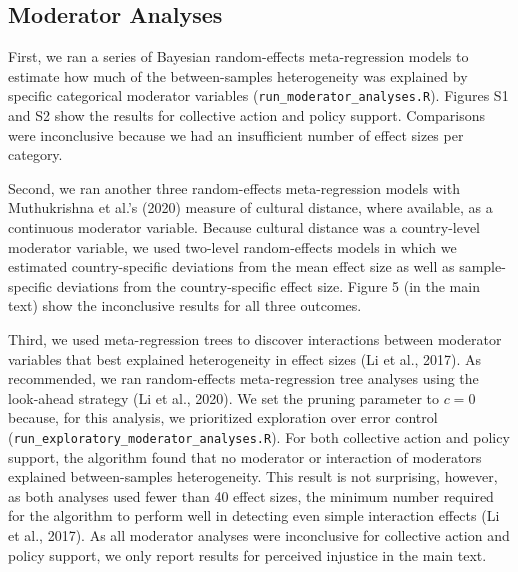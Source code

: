 \documentclass[12pt, letterpaper]{article}
\begin{document}
\hypertarget{moderator-analyses}{%
\subsection{Moderator Analyses}\label{moderator-analyses}}

First, we ran a series of Bayesian random-effects meta-regression models
to estimate how much of the between-samples heterogeneity was explained
by specific categorical moderator variables
(\texttt{run\_moderator\_analyses.R}). Figures S1 and S2 show the
results for collective action and policy support. Comparisons were
inconclusive because we had an insufficient number of effect sizes per
category.

Second, we ran another three random-effects meta-regression models with
Muthukrishna et al.'s (2020) measure of cultural distance, where
available, as a continuous moderator variable. Because cultural distance
was a country-level moderator variable, we used two-level random-effects
models in which we estimated country-specific deviations from the mean
effect size as well as sample-specific deviations from the
country-specific effect size. Figure 5 (in the main text) show the
inconclusive results for all three outcomes.

Third, we used meta-regression trees to discover interactions between
moderator variables that best explained heterogeneity in effect sizes
(Li et al., 2017). As recommended, we ran random-effects meta-regression
tree analyses using the look-ahead strategy (Li et al., 2020). We set
the pruning parameter to \(c = 0\) because, for this analysis, we
prioritized exploration over error control
(\texttt{run\_exploratory\_moderator\_analyses.R}). For both collective
action and policy support, the algorithm found that no moderator or
interaction of moderators explained between-samples heterogeneity. This
result is not surprising, however, as both analyses used fewer than 40
effect sizes, the minimum number required for the algorithm to perform
well in detecting even simple interaction effects (Li et al., 2017). As
all moderator analyses were inconclusive for collective action and
policy support, we only report results for perceived injustice in the
main text.
\end{document}
